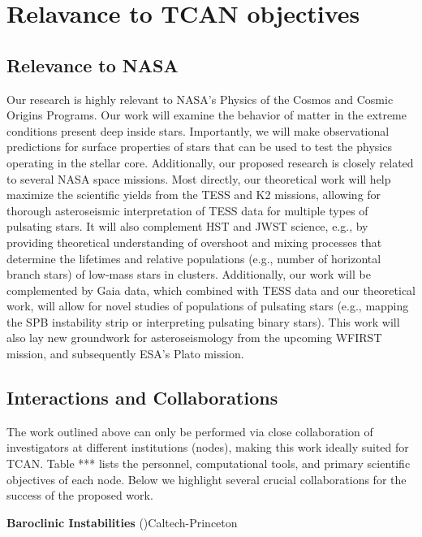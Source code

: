 {\color{orange}

\section{Relavance to TCAN objectives}

}

\subsection{Relevance to NASA}

Our research is highly relevant to NASA's Physics of the Cosmos and Cosmic Origins Programs. Our work will examine the behavior of matter in the extreme conditions present deep inside stars. Importantly, we will make observational predictions for surface properties of stars that can be used to test the physics operating in the stellar core. Additionally, our proposed research is closely related to several NASA space missions. Most directly, our theoretical work will help maximize the scientific yields from the TESS and K2 missions, allowing for thorough asteroseismic interpretation of TESS data for multiple types of pulsating stars. It will also complement HST and JWST science, e.g., by providing theoretical understanding of overshoot and mixing processes that determine the lifetimes and relative populations (e.g., number of horizontal branch stars) of low-mass stars in clusters. Additionally, our work will be complemented by Gaia data, which combined with TESS data and our theoretical work, will allow for novel studies of populations of pulsating stars (e.g., mapping the SPB instability strip or interpreting pulsating binary stars). This work will also lay new groundwork for asteroseismology from the upcoming WFIRST mission, and subsequently ESA's Plato mission. 


\subsection{Interactions and Collaborations}

The work outlined above can only be performed via close collaboration of investigators at different institutions (nodes), making this work ideally suited for TCAN. Table *** lists the personnel, computational tools, and primary scientific objectives of each node. Below we highlight several crucial collaborations for the success of the proposed work.

{\bf Baroclinic Instabilities} ()Caltech-Princeton

